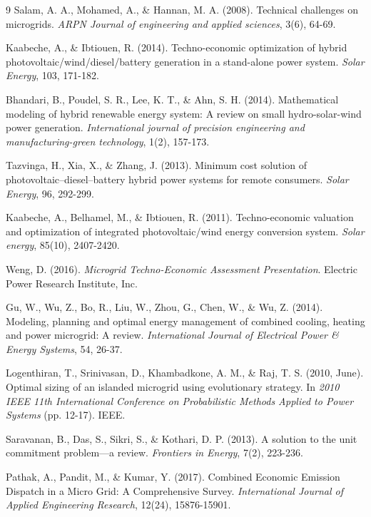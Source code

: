 \documentclass[final,3p,times]{elsarticle}
\begin{document}
\begin{thebibliography}{9}
Salam, A. A., Mohamed, A., \& Hannan, M. A. (2008). Technical challenges on microgrids. \textit{ARPN Journal of engineering and applied sciences}, 3(6), 64-69.

Kaabeche, A., \& Ibtiouen, R. (2014). Techno-economic optimization of hybrid photovoltaic/wind/diesel/battery generation in a stand-alone power system. \textit{Solar Energy}, 103, 171-182.

Bhandari, B., Poudel, S. R., Lee, K. T., \& Ahn, S. H. (2014). Mathematical modeling of hybrid renewable energy system: A review on small hydro-solar-wind power generation. \textit{International journal of precision engineering and manufacturing-green technology}, 1(2), 157-173.

Tazvinga, H., Xia, X., \& Zhang, J. (2013). Minimum cost solution of photovoltaic–diesel–battery hybrid power systems for remote consumers. \textit{Solar Energy}, 96, 292-299.

Kaabeche, A., Belhamel, M., \& Ibtiouen, R. (2011). Techno-economic valuation and optimization of integrated photovoltaic/wind energy conversion system. \textit{Solar energy}, 85(10), 2407-2420.

Weng, D. (2016). \textit{Microgrid Techno-Economic Assessment Presentation}. Electric Power Research Institute, Inc.

Gu, W., Wu, Z., Bo, R., Liu, W., Zhou, G., Chen, W., \& Wu, Z. (2014). Modeling, planning and optimal energy management of combined cooling, heating and power microgrid: A review. \textit{International Journal of Electrical Power \& Energy Systems}, 54, 26-37.

Logenthiran, T., Srinivasan, D., Khambadkone, A. M., \& Raj, T. S. (2010, June). Optimal sizing of an islanded microgrid using evolutionary strategy. In \textit{2010 IEEE 11th International Conference on Probabilistic Methods Applied to Power Systems} (pp. 12-17). IEEE.

Saravanan, B., Das, S., Sikri, S., \& Kothari, D. P. (2013). A solution to the unit commitment problem—a review. \textit{Frontiers in Energy}, 7(2), 223-236.

Pathak, A., Pandit, M., \& Kumar, Y. (2017). Combined Economic Emission Dispatch in a Micro Grid: A Comprehensive Survey. \textit{International Journal of Applied Engineering Research}, 12(24), 15876-15901.


\end{thebibliography}
\end{document}
